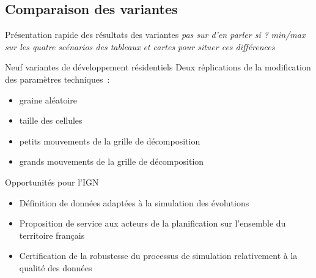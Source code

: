\documentclass[xcolor=table]{beamer}
\newcommand\FontPetit{\fontsize{8}{6}\selectfont}
\begin{document}
\subsection{Comparaison des variantes}

\begin{frame}{Présentation rapide des résultats des variantes}
\textit{pas sur d'en parler si ?}
\textit{min/max sur les quatre scénarios des tableaux et cartes pour situer ces différences}
\begin{block}{Neuf variantes de développement résidentiels}
	\vspace{0.1cm}
	Deux réplications de la modification des paramètres techniques~:
	\begin{itemize}
		\item graine aléatoire
		\item taille des cellules
		\item petits mouvements de la grille de décomposition
		\item grands mouvements de la grille de décomposition
	\end{itemize}
\end{block}
\end{frame}



\begin{frame}{Opportunités pour l'IGN}
\begin{itemize}
	\item Définition de données adaptées à la simulation des évolutions
	\item Proposition de service aux acteurs de la planification sur l'ensemble du territoire français
	\item Certification de la robustesse du processus de simulation relativement à la qualité des données
\end{itemize}
\end{frame}
\end{document}
